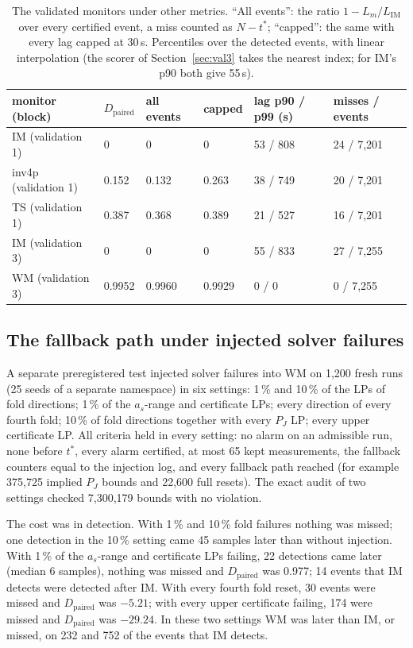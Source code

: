 \documentclass[11pt,a4paper]{article}
\newcommand{\Dp}{D_{\mathrm{paired}}}
\newcommand{\tstar}{t^{\ast}}
\begin{document}
\begin{table}[ht]
\centering\small
\caption{The validated monitors under other metrics. ``All events'': the ratio $1-L_m/L_{\mathrm{IM}}$ over every
certified event, a miss counted as $N-\tstar$; ``capped'': the same with every lag capped at 30\,s. Percentiles over
the detected events, with linear interpolation (the scorer of Section~\ref{sec:val3} takes the nearest index;
for IM's p90 both give 55\,s).}\label{tab:metrics}
\begin{tabular}{llllll}
\toprule
monitor (block) & $\Dp$ & all events & capped & lag p90 / p99 (s) & misses / events\\
\midrule
IM (validation 1) & 0 & 0 & 0 & 53 / 808 & 24 / 7,201\\
inv4p (validation 1) & 0.152 & 0.132 & 0.263 & 38 / 749 & 20 / 7,201\\
TS (validation 1) & 0.387 & 0.368 & 0.389 & 21 / 527 & 16 / 7,201\\
IM (validation 3) & 0 & 0 & 0 & 55 / 833 & 27 / 7,255\\
WM (validation 3) & 0.9952 & 0.9960 & 0.9929 & 0 / 0 & 0 / 7,255\\
\bottomrule
\end{tabular}
\end{table}

\subsection{The fallback path under injected solver failures}\label{sec:inject}

A separate preregistered test injected solver failures into WM on 1,200 fresh runs (25 seeds of a separate namespace)
in six settings: 1\,\% and 10\,\% of the LPs of fold directions; 1\,\% of the $a_s$-range and certificate LPs; every
direction of every fourth fold; 10\,\% of fold directions together with every $P_J$ LP; every upper certificate LP.
All criteria held in every setting: no alarm on an admissible run, none before $\tstar$, every alarm certified, at most
65 kept measurements, the fallback counters equal to the injection log, and every fallback path reached (for example
375,725 implied $P_J$ bounds and 22,600 full resets). The exact audit of two settings checked 7,300,179 bounds with no
violation.

The cost was in detection. With 1\,\% and 10\,\% fold failures nothing was missed; one detection in the 10\,\% setting
came 45 samples later than without injection. With 1\,\% of the $a_s$-range and certificate LPs failing, 22 detections
came later (median 6 samples), nothing was missed and $\Dp$ was 0.977; 14 events that IM detects were detected after
IM. With every fourth fold reset, 30 events were missed and $\Dp$ was $-5.21$; with every upper certificate failing,
174 were missed and $\Dp$ was $-29.24$. In these two settings WM was later than IM, or missed, on 232 and 752 of the
events that IM detects.
\end{document}
